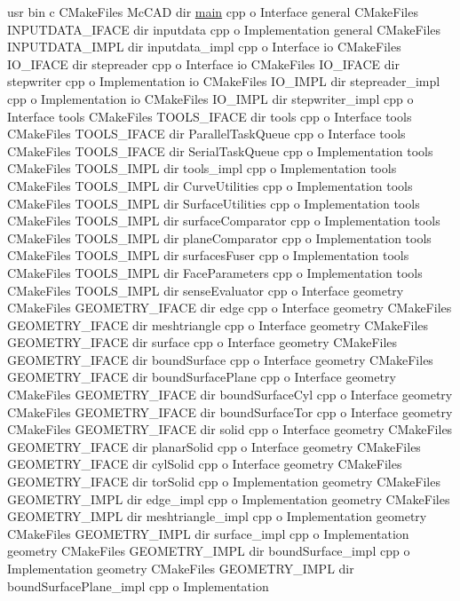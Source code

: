 \begin{DoxyCompactItemize}
usr bin c C\+Make\+Files Mc\+C\+AD dir \hyperlink{main_8cpp_ae66f6b31b5ad750f1fe042a706a4e3d4}{main} cpp o Interface general C\+Make\+Files I\+N\+P\+U\+T\+D\+A\+T\+A\+\_\+\+I\+F\+A\+CE dir inputdata cpp o Implementation general C\+Make\+Files I\+N\+P\+U\+T\+D\+A\+T\+A\+\_\+\+I\+M\+PL dir inputdata\+\_\+impl cpp o Interface io C\+Make\+Files I\+O\+\_\+\+I\+F\+A\+CE dir stepreader cpp o Interface io C\+Make\+Files I\+O\+\_\+\+I\+F\+A\+CE dir stepwriter cpp o Implementation io C\+Make\+Files I\+O\+\_\+\+I\+M\+PL dir stepreader\+\_\+impl cpp o Implementation io C\+Make\+Files I\+O\+\_\+\+I\+M\+PL dir stepwriter\+\_\+impl cpp o Interface tools C\+Make\+Files T\+O\+O\+L\+S\+\_\+\+I\+F\+A\+CE dir tools cpp o Interface tools C\+Make\+Files T\+O\+O\+L\+S\+\_\+\+I\+F\+A\+CE dir Parallel\+Task\+Queue cpp o Interface tools C\+Make\+Files T\+O\+O\+L\+S\+\_\+\+I\+F\+A\+CE dir Serial\+Task\+Queue cpp o Implementation tools C\+Make\+Files T\+O\+O\+L\+S\+\_\+\+I\+M\+PL dir tools\+\_\+impl cpp o Implementation tools C\+Make\+Files T\+O\+O\+L\+S\+\_\+\+I\+M\+PL dir Curve\+Utilities cpp o Implementation tools C\+Make\+Files T\+O\+O\+L\+S\+\_\+\+I\+M\+PL dir Surface\+Utilities cpp o Implementation tools C\+Make\+Files T\+O\+O\+L\+S\+\_\+\+I\+M\+PL dir surface\+Comparator cpp o Implementation tools C\+Make\+Files T\+O\+O\+L\+S\+\_\+\+I\+M\+PL dir plane\+Comparator cpp o Implementation tools C\+Make\+Files T\+O\+O\+L\+S\+\_\+\+I\+M\+PL dir surfaces\+Fuser cpp o Implementation tools C\+Make\+Files T\+O\+O\+L\+S\+\_\+\+I\+M\+PL dir Face\+Parameters cpp o Implementation tools C\+Make\+Files T\+O\+O\+L\+S\+\_\+\+I\+M\+PL dir sense\+Evaluator cpp o Interface geometry C\+Make\+Files G\+E\+O\+M\+E\+T\+R\+Y\+\_\+\+I\+F\+A\+CE dir edge cpp o Interface geometry C\+Make\+Files G\+E\+O\+M\+E\+T\+R\+Y\+\_\+\+I\+F\+A\+CE dir meshtriangle cpp o Interface geometry C\+Make\+Files G\+E\+O\+M\+E\+T\+R\+Y\+\_\+\+I\+F\+A\+CE dir surface cpp o Interface geometry C\+Make\+Files G\+E\+O\+M\+E\+T\+R\+Y\+\_\+\+I\+F\+A\+CE dir bound\+Surface cpp o Interface geometry C\+Make\+Files G\+E\+O\+M\+E\+T\+R\+Y\+\_\+\+I\+F\+A\+CE dir bound\+Surface\+Plane cpp o Interface geometry C\+Make\+Files G\+E\+O\+M\+E\+T\+R\+Y\+\_\+\+I\+F\+A\+CE dir bound\+Surface\+Cyl cpp o Interface geometry C\+Make\+Files G\+E\+O\+M\+E\+T\+R\+Y\+\_\+\+I\+F\+A\+CE dir bound\+Surface\+Tor cpp o Interface geometry C\+Make\+Files G\+E\+O\+M\+E\+T\+R\+Y\+\_\+\+I\+F\+A\+CE dir solid cpp o Interface geometry C\+Make\+Files G\+E\+O\+M\+E\+T\+R\+Y\+\_\+\+I\+F\+A\+CE dir planar\+Solid cpp o Interface geometry C\+Make\+Files G\+E\+O\+M\+E\+T\+R\+Y\+\_\+\+I\+F\+A\+CE dir cyl\+Solid cpp o Interface geometry C\+Make\+Files G\+E\+O\+M\+E\+T\+R\+Y\+\_\+\+I\+F\+A\+CE dir tor\+Solid cpp o Implementation geometry C\+Make\+Files G\+E\+O\+M\+E\+T\+R\+Y\+\_\+\+I\+M\+PL dir edge\+\_\+impl cpp o Implementation geometry C\+Make\+Files G\+E\+O\+M\+E\+T\+R\+Y\+\_\+\+I\+M\+PL dir meshtriangle\+\_\+impl cpp o Implementation geometry C\+Make\+Files G\+E\+O\+M\+E\+T\+R\+Y\+\_\+\+I\+M\+PL dir surface\+\_\+impl cpp o Implementation geometry C\+Make\+Files G\+E\+O\+M\+E\+T\+R\+Y\+\_\+\+I\+M\+PL dir bound\+Surface\+\_\+impl cpp o Implementation geometry C\+Make\+Files G\+E\+O\+M\+E\+T\+R\+Y\+\_\+\+I\+M\+PL dir bound\+Surface\+Plane\+\_\+impl cpp o Implementation 
\end{DoxyCompactItemize}
